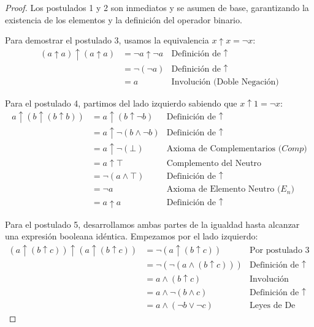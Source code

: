 \begin{proof}
Los postulados 1 y 2 son inmediatos y se asumen de base, garantizando la existencia de los elementos y la definición del operador binario.

Para demostrar el postulado 3, usamos la equivalencia $x \uparrow x = \neg x$:
\begin{align*}
(a \uparrow a) \uparrow (a \uparrow a) &= \neg a \uparrow \neg a & \text{Definición de } \uparrow \\
&= \neg (\neg a) & \text{Definición de } \uparrow \\
&= a & \text{Involución (Doble Negación)}
\end{align*}

Para el postulado 4, partimos del lado izquierdo sabiendo que $x \uparrow 1 = \neg x$:
\begin{align*}
a \uparrow (b \uparrow (b \uparrow b)) &= a \uparrow (b \uparrow \neg b) & \text{Definición de } \uparrow \\
&= a \uparrow \neg (b \wedge \neg b) & \text{Definición de } \uparrow \\
&= a \uparrow \neg (\bot) & \text{Axioma de Complementarios ($Comp$)} \\
&= a \uparrow \top & \text{Complemento del Neutro} \\
&= \neg (a \wedge \top) & \text{Definición de } \uparrow \\
&= \neg a & \text{Axioma de Elemento Neutro ($E_n$)} \\
&= a \uparrow a & \text{Definición de } \uparrow
\end{align*}

Para el postulado 5, desarrollamos ambas partes de la igualdad hasta alcanzar una expresión booleana idéntica. Empezamos por el lado izquierdo:
\begin{align*}
(a \uparrow (b \uparrow c)) \uparrow (a \uparrow (b \uparrow c)) &= \neg (a \uparrow (b \uparrow c)) & \text{Por postulado 3} \\
&= \neg (\neg (a \wedge (b \uparrow c))) & \text{Definición de } \uparrow \\
&= a \wedge (b \uparrow c) & \text{Involución} \\
&= a \wedge \neg (b \wedge c) & \text{Definición de } \uparrow \\
&= a \wedge (\neg b \vee \neg c) & \text{Leyes de De Morgan}
\end{align*}


\end{proof}
